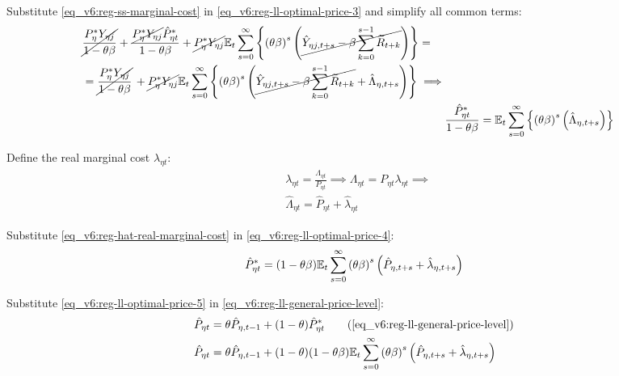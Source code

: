 \documentclass[../thesis.tex]{subfiles}
\begin{document}
Substitute \ref{eq_v6:reg-ss-marginal-cost} in \ref{eq_v6:reg-ll-optimal-price-3} and simplify all common terms:
\begin{align}
	\begin{split}
		& \cancel{\frac{P_{\eta}^{\ast} Y_{\eta j}}{1-\theta\beta}} + \frac{ \cancel{P_{\eta}^{\ast} Y_{\eta j}} \hat{P}_{\eta t}^{\ast}}{1- \theta \beta} + \cancel{P_{\eta}^{\ast} Y_{\eta j}} {\mathbb{E}_{t}} \sum_{s=0}^{\infty} \left\{ \left( \theta \beta \right)^s \left( \cancel{\hat{Y}_{\eta j, t+s} - \beta \sum_{k=0}^{s-1} \widetilde{R}_{t+k}} \right) \right\} = 
		\\
		& = \cancel{\frac{P_{\eta}^{\ast} Y_{\eta j}}{1-\theta\beta}} \, + \cancel{P_{\eta}^{\ast} Y_{\eta j}} {\mathbb{E}_{t}} \sum_{s=0}^{\infty} \left\{ \left( \theta \beta \right)^s \left( \cancel{\hat{Y}_{\eta j, t+s} - \beta \sum_{k=0}^{s-1} \widetilde{R}_{t+k}} + \hat{\Lambda}_{\eta, t+s} \right) \right\} \implies	
	\end{split} \nonumber \\
	& \frac{ \hat{P}_{\eta t}^{\ast}}{1- \theta \beta} = {\mathbb{E}_{t}} \sum_{s=0}^{\infty} \left\{ \left( \theta \beta \right)^s \left( \hat{\Lambda}_{\eta, t+s} \right) \right\} \label{eq_v6:reg-ll-optimal-price-4}
\end{align}



Define the real marginal cost $\lambda_{\eta t}$:
\begin{align}
	& \lambda_{\eta t} = \frac{\Lambda_{\eta t}}{P_{\eta t}} \implies \Lambda_{\eta t} = P_{\eta t} \lambda_{\eta t} \implies \nonumber \\
	& \hat{\Lambda}_{\eta t} = \hat{P}_{\eta t} + \hat{\lambda}_{\eta t} \label{eq_v6:reg-hat-real-marginal-cost}
\end{align}

Substitute \ref{eq_v6:reg-hat-real-marginal-cost} in \ref{eq_v6:reg-ll-optimal-price-4}:
\begin{align}
	\hat{P}_{\eta t}^{\ast} = (1- \theta \beta) {\mathbb{E}_{t}} \sum_{s=0}^{\infty} \left( \theta \beta \right)^s \left( \hat{P}_{\eta, t+s} + \hat{\lambda}_{\eta, t+s} \right) \label{eq_v6:reg-ll-optimal-price-5}
\end{align}

Substitute \ref{eq_v6:reg-ll-optimal-price-5} in \ref{eq_v6:reg-ll-general-price-level}:
\begin{align}
	\hat{P}_{\eta t} &= \theta \hat{P}_{\eta, t-1} + (1-\theta) \hat{P}_{\eta t}^{\ast} \tag{\ref{eq_v6:reg-ll-general-price-level}}\\
	\hat{P}_{\eta t} &= \theta \hat{P}_{\eta, t-1} + (1-\theta) (1- \theta \beta) \E \sum_{s=0}^{\infty} \left( \theta \beta \right)^s \left( \hat{P}_{\eta, t+s} + \hat{\lambda}_{\eta, t+s} \right) \label{eq_v6:reg-ll-general-price-level-2}
\end{align}
\end{document}
